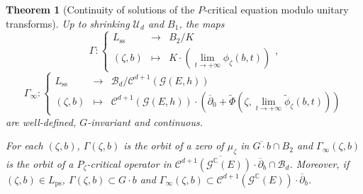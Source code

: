 \documentclass{article}
\newtheorem{theorem}{Theorem}[section]
\theoremstyle{remark}
\theoremstyle{definition}
\newcommand{\C}{\mathbb{C}}
\newcommand{\G}{\mathcal{G}}
\newcommand{\mB}{\mathcal{B}}
\newcommand{\mC}{\mathcal{C}}
\newcommand{\mU}{\mathcal{U}}
\newcommand{\dbar}{\overline{\partial}}
\newcommand{\fonction}[4]{\left\{ \begin{array}{rcl}
		\displaystyle #1 & \longrightarrow & \displaystyle #2\\
		\displaystyle #3 & \longmapsto & \displaystyle #4
	\end{array} \right.}
\begin{document}
\begin{theorem}[Continuity of solutions of the $P$-critical equation modulo unitary transforms]\label{THE:Continuité des opérateurs P-critiques}
    Up to shrinking $\mU_d$ and $B_1$, the maps
    $$
    \Gamma : \fonction{L_{\mathrm{ss}}}{B_2/K}{(\zeta,b)}{K \cdot \left(\lim_{t \rightarrow +\infty} \phi_\zeta(b,t)\right)},
    $$
    $$
    \Gamma_\infty : \fonction{L_{\mathrm{ss}}}{\mB_d/\mC^{d + 1}(\G(E,h))}{(\zeta,b)}{\mC^{d + 1}(\G(E,h)) \cdot \left(\dbar_0 + \tilde{\Phi}(\zeta,\lim_{t \rightarrow +\infty} \tilde{\phi}_\zeta(b,t))\right)}
    $$
    are well-defined, $G$-invariant and continuous.
    
    For each $(\zeta,b)$, $\Gamma(\zeta,b)$ is the orbit of a zero of $\mu_\zeta$ in $\overline{G \cdot b} \cap B_2$ and $\Gamma_\infty(\zeta,b)$ is the orbit of a $P_\zeta$-critical operator in $\overline{\mC^{d + 1}(\G^\C(E)) \cdot \dbar_b} \cap \mB_d$. Moreover, if $(\zeta,b) \in L_{\mathrm{ps}}$, $\Gamma(\zeta,b) \subset G \cdot b$ and $\Gamma_\infty(\zeta,b) \subset \mC^{d + 1}(\G^\C(E)) \cdot \dbar_b$.
\end{theorem}
\end{document}
